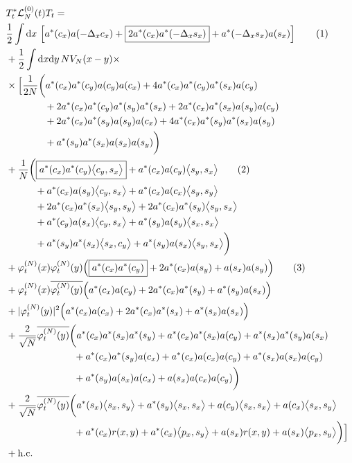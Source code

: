 \documentclass[11pt,a4paper,draft,DIV11]{scrartcl}	%
\newcommand{\di}{\textrm{d}}		%
\newcommand{\Lcal}{\mathcal{L}}		%
\newcommand{\hc}{\mbox{h.c.}}		%
\newcommand{\scal}[2]{\big<#1,#2\big>} %
\newcommand{\cc}[1]{\overline{#1}}	%
\newcommand{\ph}{\varphi_t^{(N)}}	%
\newcommand{\tagg}[1]{ \stepcounter{equation} \tag{\theequation} \label{eq:#1} } %
\begin{document}
\begin{align*}
& T^*_t \Lcal_N^{(0)}(t) T_t = \\ 
& \frac{1}{2} \int \di x\, \left[ a^*(c_x) a(-\Delta_x c_x) + \boxed{2 a^*(c_x) a^*(-\Delta_x s_x)} + a^*(-\Delta_x s_x) a(s_x) \right] \tagg{cancellation_kinetic} \\
& + \frac{1}{2}\int \di x \di y\, NV_N(x-y) \times \\
& \times \Big[   \frac{1}{2N}\bigg( a^*(c_x) a^*(c_y) a(c_y) a(c_x) + 4 a^*(c_x) a^*(c_y) a^*(s_x) a(c_y) \\
				      & \qquad\qquad + 2 a^*(c_x) a^*(c_y) a^*(s_y) a^*(s_x) + 2 a^*(c_x) a^*(s_x) a(s_y) a(c_y) \\
				      & \qquad\qquad + 2 a^*(c_x) a^*(s_y) a(s_y) a(c_x) + 4 a^*(c_x) a^*(s_y) a^*(s_x) a(s_y) \\
				      & \qquad\qquad + a^*(s_y) a^*(s_x) a(s_x) a(s_y) \bigg) \\
& + \frac{1}{N}\bigg(   \boxed{a^*(c_x)a^*(c_y) \scal{c_y}{s_x}} + a^*(c_x) a(c_y) \scal{s_y}{s_x} \tagg{cancellation_normalorder} \\
			& \qquad\quad + a^*(c_x) a(s_y) \scal{c_y}{s_x} + a^*(c_x) a(c_x) \scal{s_y}{s_y} \\
			& \qquad\quad + 2 a^*(c_x) a^*(s_x) \scal{s_y}{s_y} + 2a^*(c_x)a^*(s_y) \scal{s_y}{s_x} \\
			& \qquad\quad + a^*(c_y) a(s_x) \scal{c_y}{s_x} +  a^*(s_y) a(s_y) \scal{s_x}{s_x}\\
			& \qquad\quad + a^*(s_y) a^*(s_x) \scal{s_x}{c_y} + a^*(s_y) a(s_x) \scal{s_y}{s_x}   \bigg) \\
& + \ph(x)\ph(y) \Big( \boxed{a^*(c_x) a^*(c_y)} + 2 a^*(c_x) a(s_y) +a(s_x) a(s_y) \Big) \tagg{cancellation_standard} \\
& + \ph(x) \cc{\ph(y)} \Big( a^*(c_x) a(c_y) + 2 a^*(c_x) a^*(s_y) + a^*(s_y) a(s_x) \Big) \\
& + \lvert \ph(y) \rvert^2 \Big( a^*(c_x) a(c_x) + 2 a^*(c_x) a^*(s_x) + a^*(s_x) a(s_x) \Big) \\
& + \frac{2}{\sqrt{N}}\cc{\ph(y)} \bigg(    a^*(c_x) a^*(s_x) a^*(s_y) + a^*(c_x) a^*(s_x) a(c_y) + a^*(s_x) a^*(s_y) a(s_x)\\
					    & \qquad\qquad\qquad\quad + a^*(c_x) a^*(s_y) a(c_x) + a^*(c_x) a(c_x) a(c_y)+ a^*(s_x) a(s_x) a(c_y) \\
					    & \qquad\qquad\qquad\quad + a^*(s_y) a(s_x) a(c_x) + a(s_x) a(c_x) a(c_y)    \bigg) \\
& + \frac{2}{\sqrt{N}}\cc{\ph(y)} \bigg(    a^*(s_x) \scal{s_x}{s_y} + a^*(s_y) \scal{s_x}{s_x}  + a(c_y) \scal{s_x}{s_x} + a(c_x) \scal{s_x}{s_y} \\
					    & \qquad\qquad\qquad\quad + a^*(c_x)r(x,y) + a^*(c_x)\scal{p_x}{s_y} + a(s_x)r(x,y) + a(s_x)\scal{p_x}{s_y}		\bigg)    \Big]\\
& + \hc
\end{align*}
\end{document}
